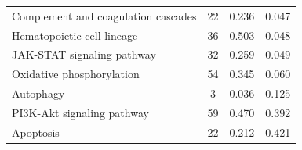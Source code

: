 \documentclass[a4paper,12pt]{article}
\begin{document}
\begin{longtable}{>{\raggedright\arraybackslash}p{8cm} c c c}
  Complement and coagulation cascades       & 22    & 0.236         & 0.047                                                      \\
  Hematopoietic cell lineage                & 36    & 0.503         & 0.048                                                      \\
  JAK-STAT signaling pathway                & 32    & 0.259         & 0.049                                                      \\
  Oxidative phosphorylation                 & 54    & 0.345         & 0.060                                                      \\
  Autophagy                                 & 3     & 0.036         & 0.125                                                      \\
  PI3K-Akt signaling pathway                & 59    & 0.470         & 0.392                                                      \\
  Apoptosis                                 & 22    & 0.212         & 0.421                                                      \\
  \bottomrule
\end{longtable}
\end{document}
